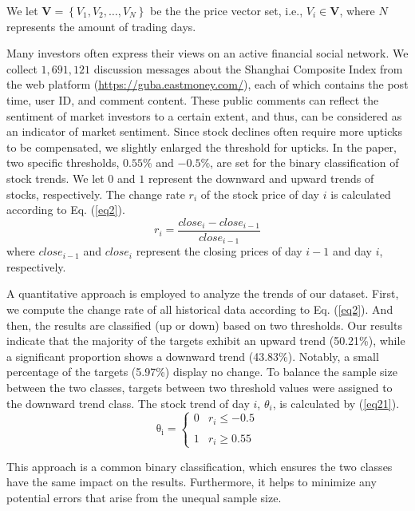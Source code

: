 \documentclass[sn-mathphys]{sn-jnl}%
\theoremstyle{thmstyleone}%
\theoremstyle{thmstyletwo}%
\theoremstyle{thmstylethree}%
\begin{document}
We let $\mathbf{V}=\left\{ V_1,V_2, \ldots,V_N\right\}$ be the the price vector set, i.e., $V_i\in\mathbf{V}$, where $N$ represents the amount of trading days.

Many investors often express their views on an active financial social network. We collect $1,691,121$ discussion messages about the Shanghai Composite Index from the web platform (\url{https://guba.eastmoney.com/}), each of which contains the post time, user ID, and comment content. These public comments can reflect the sentiment of market investors to a certain extent, and thus, can be considered as an indicator of market sentiment.
Since stock declines often require more upticks to be compensated, we slightly enlarged the threshold for upticks. In the paper, two specific thresholds, $0.55\%$ and $-0.5\%$, are set for the binary classification of stock trends. We let $0$ and $1$ represent the downward and upward trends of stocks, respectively. The change rate $r_i$ of the stock price of day $i$ is calculated according to Eq. (\ref{eq2}).
\begin{equation}
r_i=\frac{close_i-close_{i-1}}{close_{i-1}} \label{eq2}
\end{equation}
where $close_{i-1}$ and $close_i$ represent the closing prices of day $i-1$ and day $i$, respectively.

A quantitative approach is employed to analyze the trends of our dataset. First, we compute the change rate of all historical data according to Eq. (\ref{eq2}). And then, the results are classified (up or down) based on two thresholds. Our results indicate that the majority of the targets exhibit an upward trend (50.21\%), while a significant proportion shows a downward trend (43.83\%). Notably, a small percentage of the targets (5.97\%) display no change. To balance the sample size between the two classes, targets between two threshold values were assigned to the downward trend class. The stock trend of day $i$, $\theta_i$, is calculated by (\ref{eq21}).
\begin{equation}
\operatorname{\theta_i}=\left\{\begin{array}{cc}0 & r_i \leq-0.5 \\ \\ 1 & r_i \geq 0.55\end{array}\right. \label{eq21}
\end{equation}

This approach is a common binary classification, which ensures the two classes have the same impact on the results. Furthermore, it helps to minimize any potential errors that arise from the unequal sample size.
\end{document}
